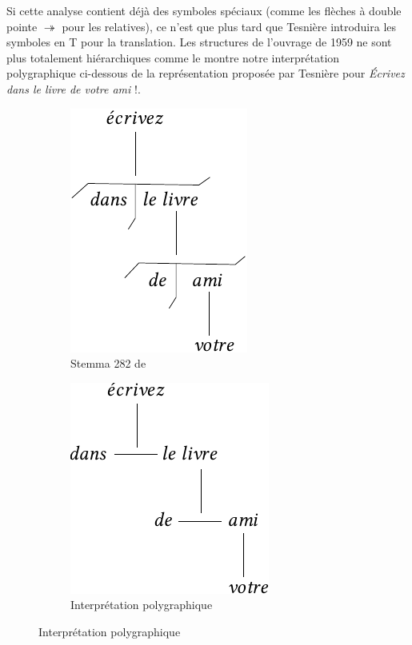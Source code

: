 {    Si cette analyse contient déjà des symboles spéciaux (comme les flèches à double pointe \textrm{$\twoheadrightarrow $} pour les relatives), ce n’est que plus tard que Tesnière introduira les symboles en T pour la translation. Les structures de l’ouvrage de 1959 ne sont plus totalement hiérarchiques comme le montre notre interprétation polygraphique ci-dessous de la représentation proposée par Tesnière pour \textit{Écrivez dans le livre de votre ami} !.

    \begin{figure}[H]
    \caption{Interprétation polygraphique d'un stemma}
    \begin{subfigure}[b]{.5\textwidth}\centering
    \includegraphics[scale=.9]{figures/polygraphs/poly-3.3.5-1.pdf}
    \caption{Stemma 282 de \citet{tesniere1959elements}}
    \end{subfigure}%
    \begin{subfigure}[b]{.5\textwidth}\centering
    \includegraphics[scale=.9]{figures/polygraphs/poly-3.3.5-2.pdf}
    \caption{Interprétation polygraphique}
    \end{subfigure}
    \end{figure}
}

